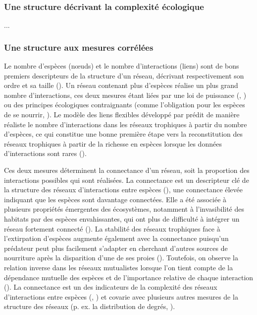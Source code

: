 \subsubsection{Une structure décrivant la complexité écologique} 

...

\subsubsection{Une structure aux mesures corrélées} 

Le nombre d'espèces (nœuds) et le nombre d'interactions (liens) sont de bons
premiers descripteurs de la structure d'un réseau, décrivant respectivement son
ordre et sa taille (\cite{Delmas2019Analysing}). Un réseau contenant plus
d'espèces réalise un plus grand nombre d'interactions, ces deux mesures étant
liées par une loi de puissance (\cite{Brose2004Unified},
\cite{Riede2010Chapter}) ou des principes écologiques contraignants (comme
l'obligation pour les espèces de se nourrir, \cite{MacDonald2020Revisiting}). Le
modèle des liens flexibles développé par \cite{MacDonald2020Revisiting} prédit
de manière réaliste le nombre d'interactions dans les réseaux trophiques à
partir du nombre d'espèces, ce qui constitue une bonne première étape vers la
reconstitution des réseaux trophiques à partir de la richesse en espèces lorsque
les données d'interactions sont rares (\cite{Strydom2021Roadmapa}). 

Ces deux mesures déterminent la connectance d'un réseau, soit la proportion des
interactions possibles qui sont réalisées. La connectance est un descripteur clé
de la structure des réseaux d'interactions entre espèces
(\cite{Martinez1992Constant}), une connectance élevée indiquant que les espèces
sont davantage connectées. Elle a été associée à plusieurs propriétés émergentes
des écosystèmes, notamment à l'invasibilité des habitats par des espèces
envahissantes, qui ont plus de difficulté à intégrer un réseau fortement
connecté (\cite{Smith-Ramesh2017Global}). La stabilité des réseaux trophiques
face à l'extirpation d'espèces augmente également avec la connectance puisqu'un
prédateur peut plus facilement s'adapter en cherchant d'autres sources de
nourriture après la disparition d'une de ses proies (\cite{Dunne2002Network}).
Toutefois, on observe la relation inverse dans les réseaux mutualistes lorsque
l'on tient compte de la dépendance mutuelle des espèces et de l'importance
relative de chaque interaction (\cite{Vieira2015Simple}). La connectance est un
des indicateurs de la complexité des réseaux d'interactions entre espèces
(\cite{Landi2018Complexity}, \cite{Strydom2021Svd}) et covarie avec plusieurs
autres mesures de la structure des réseaux (p. ex. la distribution de degrés,
\cite{Poisot2014When}).

